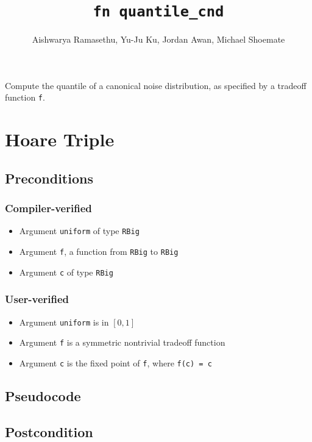 \documentclass{article}
\title{\texttt{fn quantile\_cnd}}
\author{Aishwarya Ramasethu, Yu-Ju Ku, Jordan Awan, Michael Shoemate}
\begin{document}
\maketitle

Compute the quantile of a canonical noise distribution, as specified by a tradeoff function \texttt{f}.

\section{Hoare Triple}

\subsection*{Preconditions}
\subsubsection*{Compiler-verified}
\begin{itemize}
    \item Argument \texttt{uniform} of type \texttt{RBig}
    \item Argument \texttt{f}, a function from \texttt{RBig} to \texttt{RBig}
    \item Argument \texttt{c} of type \texttt{RBig}
\end{itemize}

\subsubsection*{User-verified}
\begin{itemize}
    \item Argument \texttt{uniform} is in $[0, 1]$
    \item Argument \texttt{f} is a symmetric nontrivial tradeoff function
    \item Argument \texttt{c} is the fixed point of \texttt{f}, where \texttt{f(c) = c}
\end{itemize}

\subsection*{Pseudocode}



\subsection*{Postcondition}
\end{document}
